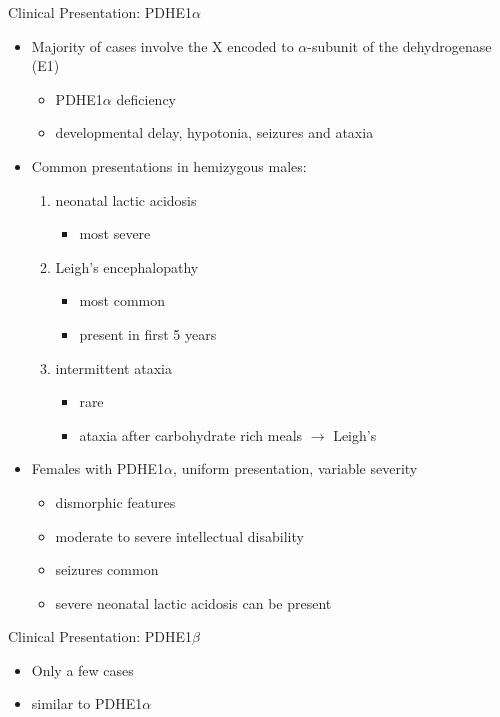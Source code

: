 \documentclass[presentation, smaller]{beamer}
\begin{document}
\begin{frame}[label={sec:orgebba020}]{Clinical Presentation: PDHE1\(\alpha\)}
\begin{itemize}
\item Majority of cases involve the X encoded to \(\alpha\)-subunit of the dehydrogenase (E1)
\begin{itemize}
\item PDHE1\(\alpha\) deficiency
\item developmental delay, hypotonia, seizures and ataxia
\end{itemize}

\item Common presentations in hemizygous males:
\begin{enumerate}
\item neonatal lactic acidosis
\begin{itemize}
\item most severe
\end{itemize}
\item Leigh's encephalopathy
\begin{itemize}
\item most common
\item present in first 5 years
\end{itemize}
\item intermittent ataxia
\begin{itemize}
\item rare
\item ataxia after carbohydrate rich meals \(\to\) Leigh's
\end{itemize}
\end{enumerate}

\item Females with PDHE1\(\alpha\), uniform presentation, variable severity
\begin{itemize}
\item dismorphic features
\item moderate to severe intellectual disability
\item seizures common
\item severe neonatal lactic acidosis can be present
\end{itemize}
\end{itemize}
\end{frame}

\begin{frame}[label={sec:org2a0ba45}]{Clinical Presentation: PDHE1\(\beta\)}
\begin{itemize}
\item Only a few cases
\item similar to PDHE1\(\alpha\)
\end{itemize}
\end{frame}
\end{document}
